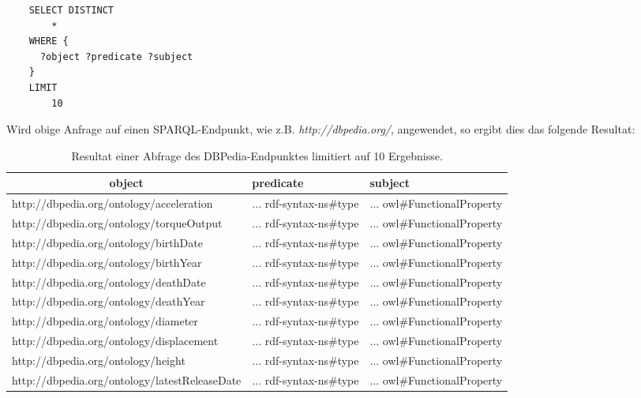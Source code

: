 \begin{lstlisting}
    SELECT DISTINCT
        *
    WHERE {
      ?object ?predicate ?subject
    }
    LIMIT
        10
\end{lstlisting}

Wird obige Anfrage auf einen SPARQL-Endpunkt, wie z.B. \textit{http://dbpedia.org/}, angewendet, so ergibt dies das folgende Resultat:
\noindent\hspace*{15mm}
\begin{table}[h]
    \centering
    \begin{tabular}{l|l|l|}
        \hline
        \multicolumn{1}{c|}{\textbf{object}}                                & \textbf{predicate}                               & \textbf{subject}                                  \\ \hline
        \multicolumn{1}{|l|}{http://dbpedia.org/ontology/acceleration}      & ... rdf-syntax-ns\#type & ... owl\#FunctionalProperty \\ \hline
        \multicolumn{1}{|l|}{http://dbpedia.org/ontology/torqueOutput}      & ... rdf-syntax-ns\#type & ... owl\#FunctionalProperty \\ \hline
        \multicolumn{1}{|l|}{http://dbpedia.org/ontology/birthDate}         & ... rdf-syntax-ns\#type & ... owl\#FunctionalProperty \\ \hline
        \multicolumn{1}{|l|}{http://dbpedia.org/ontology/birthYear}         & ... rdf-syntax-ns\#type & ... owl\#FunctionalProperty \\ \hline
        \multicolumn{1}{|l|}{http://dbpedia.org/ontology/deathDate}         & ... rdf-syntax-ns\#type & ... owl\#FunctionalProperty \\ \hline
        \multicolumn{1}{|l|}{http://dbpedia.org/ontology/deathYear}         & ... rdf-syntax-ns\#type & ... owl\#FunctionalProperty \\ \hline
        \multicolumn{1}{|l|}{http://dbpedia.org/ontology/diameter}          & ... rdf-syntax-ns\#type & ... owl\#FunctionalProperty \\ \hline
        \multicolumn{1}{|l|}{http://dbpedia.org/ontology/displacement}      & ... rdf-syntax-ns\#type & ... owl\#FunctionalProperty \\ \hline
        \multicolumn{1}{|l|}{http://dbpedia.org/ontology/height}            & ... rdf-syntax-ns\#type & ... owl\#FunctionalProperty \\ \hline
        \multicolumn{1}{|l|}{http://dbpedia.org/ontology/latestReleaseDate} & ... rdf-syntax-ns\#type & ... owl\#FunctionalProperty \\ \hline
    \end{tabular}
    \caption{Resultat einer Abfrage des DBPedia-Endpunktes limitiert auf 10 Ergebnisse.}
\end{table}

